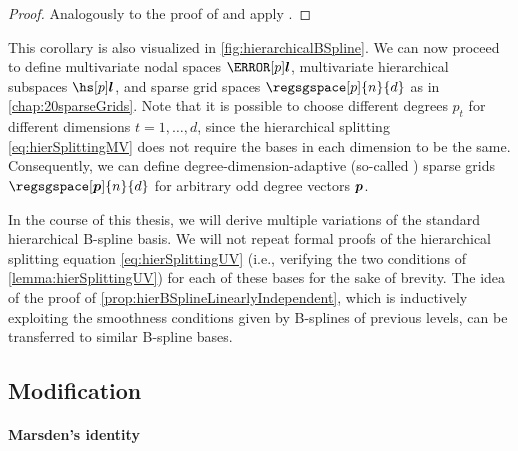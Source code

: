 \begin{proof}
  Analogously to the proof of 
  and apply .
\end{proof}

\vspace{1em}

This corollary is also visualized in \cref{fig:hierarchicalBSpline}.
We can now proceed to define
multivariate nodal spaces $\nsbspl{\*l}{p}$,
multivariate hierarchical subspaces $\hsbspl{\*l}{p}$, and
sparse grid spaces $\regsgspace[p]{n}{d}$ as in \cref{chap:20sparseGrids}.
Note that it is possible to choose different degrees $p_t$ for
different dimensions $t = 1, \dotsc, d$,
since the hierarchical splitting \eqref{eq:hierSplittingMV} does not
require the bases in each dimension to be the same.
Consequently, we can define degree-dimension-adaptive
(so-called ) sparse grids
$\regsgspace[\*p]{n}{d}$ for arbitrary odd degree vectors ${\boldsymbol{p}}$.

In the course of this thesis, we will derive multiple variations
of the standard hierarchical B-spline basis.
We will not repeat formal proofs of the hierarchical splitting equation
\eqref{eq:hierSplittingUV}
(i.e., verifying the two conditions of \cref{lemma:hierSplittingUV})
for each of these bases for the sake of brevity.
The idea of the proof of \cref{prop:hierBSplineLinearlyIndependent},
which is inductively exploiting the smoothness conditions given by
B-splines of previous levels, can be transferred to similar B-spline
bases.



\subsection{Modification}
\label{sec:313modification}

\paragraph{Marsden's identity}

